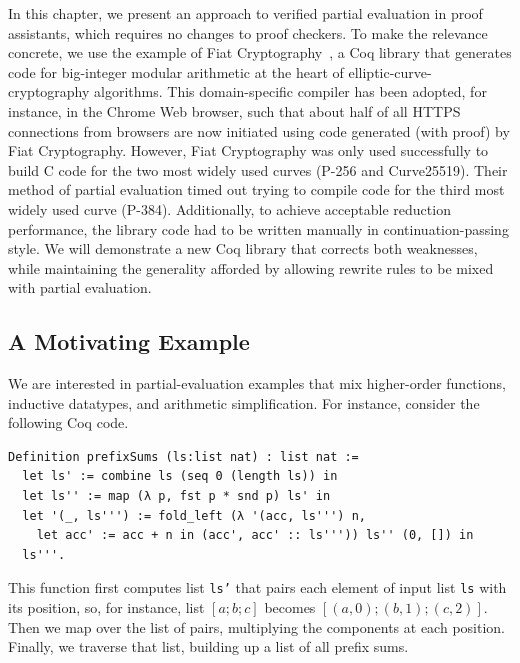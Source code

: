 In this chapter, we present an approach to verified partial evaluation in proof assistants, which requires no changes to proof checkers.
To make the relevance concrete, we use the example of Fiat Cryptography~\cite{FiatCryptoSP19}, a Coq library that generates code for big-integer modular arithmetic at the heart of elliptic-curve-cryptography algorithms.
This domain-specific compiler has been adopted, for instance, in the Chrome Web browser, such that about half of all HTTPS connections from browsers are now initiated using code generated (with proof) by Fiat Cryptography.
However, Fiat Cryptography was only used successfully to build C code for the two most widely used curves (P-256 and Curve25519).
Their method of partial evaluation timed out trying to compile code for the third most widely used curve (P-384).
Additionally, to achieve acceptable reduction performance, the library code had to be written manually in continuation-passing style.
We will demonstrate a new Coq library that corrects both weaknesses, while maintaining the generality afforded by allowing rewrite rules to be mixed with partial evaluation.

\subsection{A Motivating Example} \label{sec:motivating-example} \label{sec:explain-ident.eagerly} \label{sec:explain-eval-rect} \label{sec:explain-'}

We are interested in partial-evaluation examples that mix higher-order functions, inductive datatypes, and arithmetic simplification.
For instance, consider the following Coq code.

\begin{verbatim}
Definition prefixSums (ls:list nat) : list nat :=
  let ls' := combine ls (seq 0 (length ls)) in
  let ls'' := map (λ p, fst p * snd p) ls' in
  let '(_, ls''') := fold_left (λ '(acc, ls''') n,
    let acc' := acc + n in (acc', acc' :: ls''')) ls'' (0, []) in
  ls'''.
\end{verbatim}

This function first computes list \texttt{ls'} that pairs each element of input list \texttt{ls} with its position, so, for instance, list $[a; b; c]$ becomes $[(a, 0); (b, 1); (c, 2)]$.
Then we map over the list of pairs, multiplying the components at each position.
Finally, we traverse that list, building up a list of all prefix sums.

